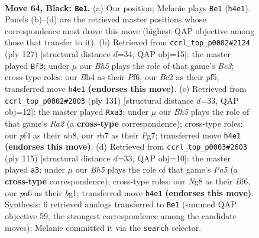 \documentclass[11pt]{article}
\begin{document}
\clearpage

\begin{figure}[p]\centering
\begin{subfigure}{0.46\textwidth}\centering
\resizebox{\linewidth}{!}{%
\newchessgame
\chessboard[
  setfen={6nk/pR6/P6p/5p2/1P3P1b/7R/2br4/6K1 b - - 4 64},
  showmover=false,
  pgfstyle=straightmove, color=movearrow, markmove={h4-e1}
]}
\caption{}
\end{subfigure}\hfill
\begin{subfigure}{0.46\textwidth}\centering
\resizebox{\linewidth}{!}{%
\newchessgame
\chessboard[
  setfen={8/2kn4/2b1Rp2/5P1p/p2K1P1P/P7/8/8 b - - 0 64},
  showmover=false,
  pgfstyle=straightmove, color=movearrow, markmove={c6-f3}
]}
\caption{}
\end{subfigure}
\\[4pt]
\begin{subfigure}{0.46\textwidth}\centering
\resizebox{\linewidth}{!}{%
\newchessgame
\chessboard[
  setfen={1N3nk1/r5p1/4p3/1B2P1bp/1P1P4/R7/6K1/3R4 b - - 0 66},
  showmover=false,
  pgfstyle=straightmove, color=movearrow, markmove={a7-a3}
]}
\caption{}
\end{subfigure}\hfill
\begin{subfigure}{0.46\textwidth}\centering
\resizebox{\linewidth}{!}{%
\newchessgame
\chessboard[
  setfen={8/8/R2P1bk1/3r1p2/p6p/7P/4K1P1/6B1 b - - 7 58},
  showmover=false,
  pgfstyle=straightmove, color=movearrow, markmove={a4-a3}
]}
\caption{}
\end{subfigure}
\caption{\textbf{Move 64, Black: \texttt{Be1}.} (a) Our position; Melanie plays \texttt{Be1} (\texttt{h4e1}). Panels (b)--(d) are the retrieved master positions whose correspondence most drove this move (highest QAP objective among those that transfer to it). (b) Retrieved from \texttt{ccrl\_top\_p0002\#2124} (ply 127) [structural distance $d$=34, QAP obj=15]: the master played \texttt{Bf3}; under $\mu$ our \emph{Bh5} plays the role of that game's \emph{Bc3}; cross-type roles: our \emph{B}h4 as their \emph{P}f6, our \emph{B}c2 as their \emph{p}f5; transferred move \texttt{h4e1} \textbf{(endorses this move)}. (c) Retrieved from \texttt{ccrl\_top\_p0002\#2803} (ply 131) [structural distance $d$=33, QAP obj=12]: the master played \texttt{Rxa3}; under $\mu$ our \emph{Bh5} plays the role of that game's \emph{Ra2} (a \textbf{cross-type} correspondence); cross-type roles: our \emph{p}f4 as their \emph{n}b8, our \emph{r}b7 as their \emph{P}g7; transferred move \texttt{h4e1} \textbf{(endorses this move)}. (d) Retrieved from \texttt{ccrl\_top\_p0003\#2603} (ply 115) [structural distance $d$=33, QAP obj=10]: the master played \texttt{a3}; under $\mu$ our \emph{Bh5} plays the role of that game's \emph{Pa5} (a \textbf{cross-type} correspondence); cross-type roles: our \emph{N}g8 as their \emph{B}f6, our \emph{p}a6 as their \emph{b}g1; transferred move \texttt{h4e1} \textbf{(endorses this move)}. Synthesis: 6 retrieved analogs transferred to \texttt{Be1} (summed QAP objective 59, the strongest correspondence among the candidate moves); Melanie committed it via the \texttt{search} selector.}
\label{fig:thought-m127}
\end{figure}
\end{document}
